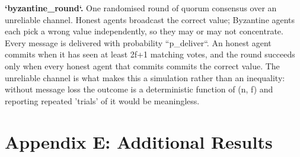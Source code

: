 \documentclass[10pt,twocolumn,letterpaper]{article}
\begin{document}
\textbf{`byzantine\_round`.} One randomised round of quorum consensus over an unreliable channel. Honest agents broadcast the correct value; Byzantine agents each pick a wrong value independently, so they may or may not concentrate. Every message is delivered with probability ``p\_deliver``. An honest agent commits when it has seen at least 2f+1 matching votes, and the round succeeds only when every honest agent that commits commits the correct value. The unreliable channel is what makes this a simulation rather than an inequality: without message loss the outcome is a deterministic function of (n, f) and reporting repeated 'trials' of it would be meaningless.




\section{Appendix E: Additional Results}
\end{document}
